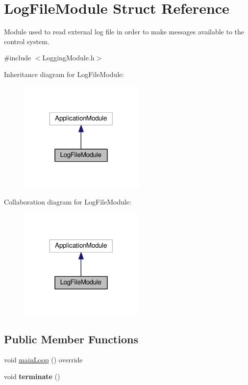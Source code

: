 \hypertarget{structLogFileModule}{}\section{Log\+File\+Module Struct Reference}
\label{structLogFileModule}


Module used to read external log file in order to make messages available to the control system.  




{\ttfamily \#include $<$Logging\+Module.\+h$>$}



Inheritance diagram for Log\+File\+Module\+:
\nopagebreak
\begin{figure}[H]
\begin{center}
\leavevmode
\includegraphics[width=176pt]{structLogFileModule__inherit__graph}
\end{center}
\end{figure}


Collaboration diagram for Log\+File\+Module\+:
\nopagebreak
\begin{figure}[H]
\begin{center}
\leavevmode
\includegraphics[width=176pt]{structLogFileModule__coll__graph}
\end{center}
\end{figure}
\subsection*{Public Member Functions}
\begin{DoxyCompactItemize}
\item 
void \hyperlink{structLogFileModule_a730fe9ac0bbe5a6ec9b4df7f9e66c5cd}{main\+Loop} () override
\item 
void {\bfseries terminate} ()\hypertarget{structLogFileModule_ada8647269480d8165b0b0ac1b521b6e5}{}\label{structLogFileModule_ada8647269480d8165b0b0ac1b521b6e5}

\end{DoxyCompactItemize}
